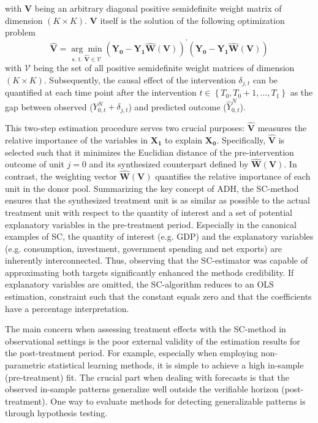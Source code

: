 with $\boldsymbol{V}$ being an arbitrary diagonal positive semidefinite weight matrix of dimension $(K \times K)$. $\boldsymbol{V}$ itself is the solution of the following optimization problem
\[
\widehat{\boldsymbol{V}} = 
\underset{\text{s. t. } \widehat{\boldsymbol{V}} \in \mathcal{V}}{\arg\min}
(\boldsymbol{Y_0} - \boldsymbol{Y_1}\boldsymbol{\widehat{W}}(\boldsymbol{V}))^\prime (\boldsymbol{Y_0} - \boldsymbol{Y_1} \boldsymbol{\widehat{W}}(\boldsymbol{V}))
\]
with $\mathcal{V}$ being the set of all positive semidefinite weight matrices of dimension $(K \times K)$. Subsequently, the causal effect of the intervention $\delta_{j,t}$ can be quantified at each time point after the intervention $t \in \left\lbrace T_{0},T_{0}+1, ..., T_{1}\right\rbrace $ as the gap between observed ($Y^{N}_{0,t} + \delta_{j,t}$) and predicted outcome ($\widehat{Y}^{N}_{0,t}$).

This two-step estimation procedure serves two crucial purposes: $\widehat{\boldsymbol{V}}$ measures the relative importance of the variables in $\boldsymbol{X_1}$ to explain $\boldsymbol{X_0}$. Specifically, $\widehat{\boldsymbol{V}}$ is selected such that it minimizes the Euclidian distance of the pre-intervention outcome of unit $j = 0$ and its synthesized counterpart defined by $\widehat{\boldsymbol{W}}(\boldsymbol{V})$. In contrast, the weighting vector $\widehat{\boldsymbol{W}}(\boldsymbol{V})$ quantifies the relative importance of each unit in the donor pool. Summarizing the key concept of \ac{ADH}, the \ac{SC}-method ensures that the synthesized treatment unit is as similar as possible to the actual treatment unit with respect to the quantity of interest and a set of potential explanatory variables in the pre-treatment period. Especially in the canonical examples of \ac{SC}, the quantity of interest (e.g. \ac{GDP}) and the explanatory variables (e.g. consumption, investment, government spending and net exports) are inherently interconnected. Thus, observing that the \ac{SC}-estimator was capable of approximating both targets significantly enhanced the methods credibility. If explanatory variables are omitted, the \ac{SC}-algorithm reduces to an \ac{OLS} estimation, constraint such that the constant equals zero and that the coefficients have a percentage interpretation.

The main concern when assessing treatment effects with the \ac{SC}-method in observational settings is the poor external validity of the estimation results for the post-treatment period. For example, especially when employing non-parametric statistical learning methods, it is simple to achieve a high in-sample (pre-treatment) fit. The crucial part when dealing with forecasts is that the observed in-sample patterns generalize well outside the verifiable horizon (post-treatment). One way to evaluate methods for detecting generalizable patterns is through hypothesis testing.

